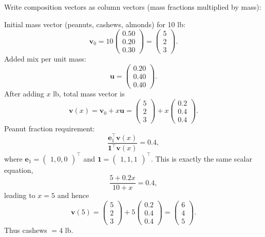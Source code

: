 \begin{enumerate}
Write composition vectors as column vectors (mass fractions multiplied by mass):

 Initial mass vector (peanuts, cashews, almonds) for 10 lb:
 \[\mathbf{v}_0 = 10 \begin{pmatrix} 0.50 \\ 0.20 \\ 0.30 \end{pmatrix} = \begin{pmatrix} 5 \\ 2 \\ 3 \end{pmatrix}.\]Added mix per unit mass:
 \[\mathbf{u} = \begin{pmatrix} 0.20 \\ 0.40 \\ 0.40 \end{pmatrix}.\]After adding \( x \) lb, total mass vector is
 \[\mathbf{v}(x) = \mathbf{v}_0 + x \mathbf{u} = \begin{pmatrix} 5 \\ 2 \\ 3 \end{pmatrix} + x \begin{pmatrix} 0.2 \\ 0.4 \\ 0.4 \end{pmatrix}.\]Peanut fraction requirement:
 \[\frac{\mathbf{e}_1^\top \mathbf{v}(x)}{\mathbf{1}^\top \mathbf{v}(x)} = 0.4,\]where \( \mathbf{e}_1 = \begin{pmatrix} 1, 0, 0 \end{pmatrix}^\top \) and \( \mathbf{1} = \begin{pmatrix} 1, 1, 1 \end{pmatrix}^\top \). This is exactly the same scalar equation,
 \[\frac{5 + 0.2x}{10 + x} = 0.4,\]leading to \( x = 5 \) and hence
 \[\mathbf{v}(5) = \begin{pmatrix} 5 \\ 2 \\ 3 \end{pmatrix} + 5 \begin{pmatrix} 0.2 \\ 0.4 \\ 0.4 \end{pmatrix} = \begin{pmatrix} 6 \\ 4 \\ 5 \end{pmatrix}.\]Thus cashews \( = 4 \) lb.


\end{enumerate}
